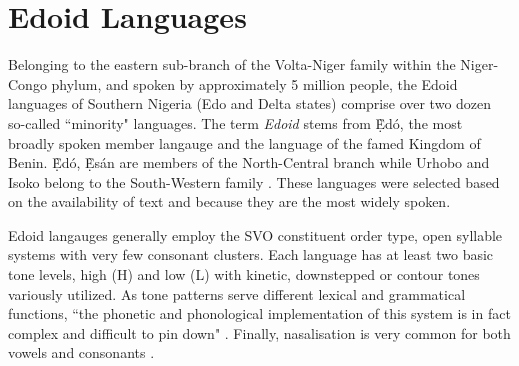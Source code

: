 \documentclass{article} %
\begin{document}

\section{Edoid Languages}


Belonging to the eastern sub-branch of the Volta-Niger family within the Niger-Congo phylum, and spoken by approximately 5 million people, the Edoid languages of Southern Nigeria (Edo and Delta states) comprise over two dozen so-called ``minority" languages. The term \emph{Edoid} stems from \d{\`E}d{\'o}, the most broadly spoken member langauge and the language of the famed Kingdom of Benin. \d{\`E}d{\'o}, \d{\`E}s{\'a}n are members of the North-Central branch while Urhobo and Isoko belong to the South-Western family \citep{ethnologue_2019}. These languages were selected based on the availability of text and because they are the most widely spoken.

Edoid langauges generally employ the SVO constituent order type, open syllable systems with very few consonant clusters. Each language has at least two basic tone levels, high (H) and low (L) with kinetic, downstepped or contour tones variously utilized. As tone patterns serve different lexical and grammatical functions, ``the phonetic and phonological implementation of this system is in fact complex and difficult to pin down" \citep{rolle2013phonetics, ogie2009multi, adeniyi2010tone, ilolo2013vowel}. Finally, nasalisation is very common for both vowels and consonants \citep{Elugbe_1989, isoko_phonetics, ikoyo2018phonetic}. 

\end{document}
